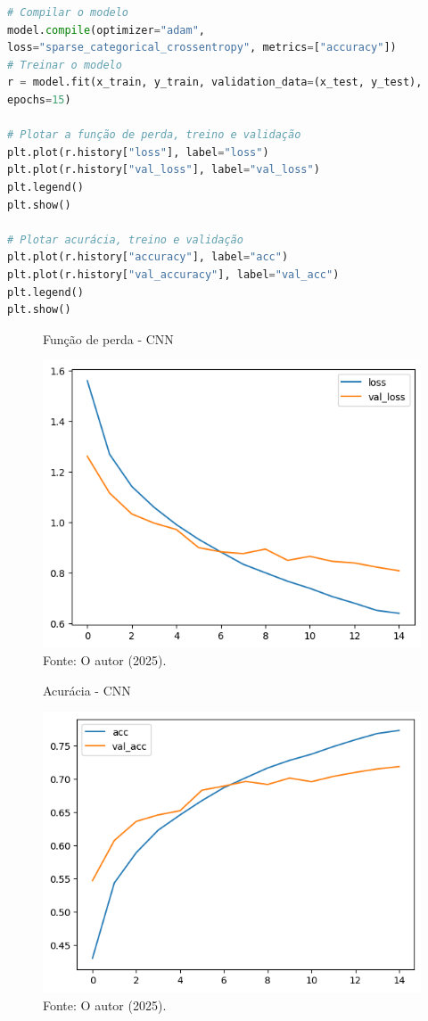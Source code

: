 \begin{lstlisting}[language=Python, style=input]
# Compilar o modelo
model.compile(optimizer="adam",
loss="sparse_categorical_crossentropy", metrics=["accuracy"])
# Treinar o modelo
r = model.fit(x_train, y_train, validation_data=(x_test, y_test),
epochs=15)

# Plotar a função de perda, treino e validação
plt.plot(r.history["loss"], label="loss")
plt.plot(r.history["val_loss"], label="val_loss")
plt.legend()
plt.show()

# Plotar acurácia, treino e validação
plt.plot(r.history["accuracy"], label="acc")
plt.plot(r.history["val_accuracy"], label="val_acc")
plt.legend()
plt.show()
\end{lstlisting}

\begin{figure}[H]
\centering
\caption{Função de perda - CNN}
\includegraphics[width=.8\linewidth]{apendices/fig/9_IAA009_1.png}
\caption*{Fonte: O autor (2025).}
\end{figure}

\begin{figure}[H]
\centering
\caption{Acurácia - CNN}
\includegraphics[width=.8\linewidth]{apendices/fig/9_IAA009_2.png}
\caption*{Fonte: O autor (2025).}
\end{figure}


